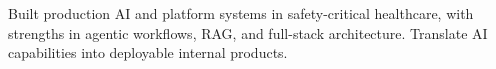 \documentclass[10pt,a4paper,ragged2e,withhyper]{altacv}
\begin{document}



\makecvheader

\small Built production AI and platform systems in safety-critical healthcare, with strengths in agentic workflows, RAG, and full-stack architecture. Translate AI capabilities into deployable internal products.

\smallskip
{}
\end{document}
